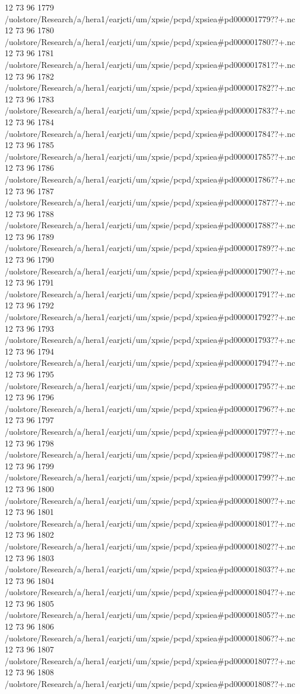 12 73 96
1779
/uolstore/Research/a/hera1/earjcti/um/xpsie/pcpd/xpsiea#pd000001779??+.nc
12 73 96
1780
/uolstore/Research/a/hera1/earjcti/um/xpsie/pcpd/xpsiea#pd000001780??+.nc
12 73 96
1781
/uolstore/Research/a/hera1/earjcti/um/xpsie/pcpd/xpsiea#pd000001781??+.nc
12 73 96
1782
/uolstore/Research/a/hera1/earjcti/um/xpsie/pcpd/xpsiea#pd000001782??+.nc
12 73 96
1783
/uolstore/Research/a/hera1/earjcti/um/xpsie/pcpd/xpsiea#pd000001783??+.nc
12 73 96
1784
/uolstore/Research/a/hera1/earjcti/um/xpsie/pcpd/xpsiea#pd000001784??+.nc
12 73 96
1785
/uolstore/Research/a/hera1/earjcti/um/xpsie/pcpd/xpsiea#pd000001785??+.nc
12 73 96
1786
/uolstore/Research/a/hera1/earjcti/um/xpsie/pcpd/xpsiea#pd000001786??+.nc
12 73 96
1787
/uolstore/Research/a/hera1/earjcti/um/xpsie/pcpd/xpsiea#pd000001787??+.nc
12 73 96
1788
/uolstore/Research/a/hera1/earjcti/um/xpsie/pcpd/xpsiea#pd000001788??+.nc
12 73 96
1789
/uolstore/Research/a/hera1/earjcti/um/xpsie/pcpd/xpsiea#pd000001789??+.nc
12 73 96
1790
/uolstore/Research/a/hera1/earjcti/um/xpsie/pcpd/xpsiea#pd000001790??+.nc
12 73 96
1791
/uolstore/Research/a/hera1/earjcti/um/xpsie/pcpd/xpsiea#pd000001791??+.nc
12 73 96
1792
/uolstore/Research/a/hera1/earjcti/um/xpsie/pcpd/xpsiea#pd000001792??+.nc
12 73 96
1793
/uolstore/Research/a/hera1/earjcti/um/xpsie/pcpd/xpsiea#pd000001793??+.nc
12 73 96
1794
/uolstore/Research/a/hera1/earjcti/um/xpsie/pcpd/xpsiea#pd000001794??+.nc
12 73 96
1795
/uolstore/Research/a/hera1/earjcti/um/xpsie/pcpd/xpsiea#pd000001795??+.nc
12 73 96
1796
/uolstore/Research/a/hera1/earjcti/um/xpsie/pcpd/xpsiea#pd000001796??+.nc
12 73 96
1797
/uolstore/Research/a/hera1/earjcti/um/xpsie/pcpd/xpsiea#pd000001797??+.nc
12 73 96
1798
/uolstore/Research/a/hera1/earjcti/um/xpsie/pcpd/xpsiea#pd000001798??+.nc
12 73 96
1799
/uolstore/Research/a/hera1/earjcti/um/xpsie/pcpd/xpsiea#pd000001799??+.nc
12 73 96
1800
/uolstore/Research/a/hera1/earjcti/um/xpsie/pcpd/xpsiea#pd000001800??+.nc
12 73 96
1801
/uolstore/Research/a/hera1/earjcti/um/xpsie/pcpd/xpsiea#pd000001801??+.nc
12 73 96
1802
/uolstore/Research/a/hera1/earjcti/um/xpsie/pcpd/xpsiea#pd000001802??+.nc
12 73 96
1803
/uolstore/Research/a/hera1/earjcti/um/xpsie/pcpd/xpsiea#pd000001803??+.nc
12 73 96
1804
/uolstore/Research/a/hera1/earjcti/um/xpsie/pcpd/xpsiea#pd000001804??+.nc
12 73 96
1805
/uolstore/Research/a/hera1/earjcti/um/xpsie/pcpd/xpsiea#pd000001805??+.nc
12 73 96
1806
/uolstore/Research/a/hera1/earjcti/um/xpsie/pcpd/xpsiea#pd000001806??+.nc
12 73 96
1807
/uolstore/Research/a/hera1/earjcti/um/xpsie/pcpd/xpsiea#pd000001807??+.nc
12 73 96
1808
/uolstore/Research/a/hera1/earjcti/um/xpsie/pcpd/xpsiea#pd000001808??+.nc
